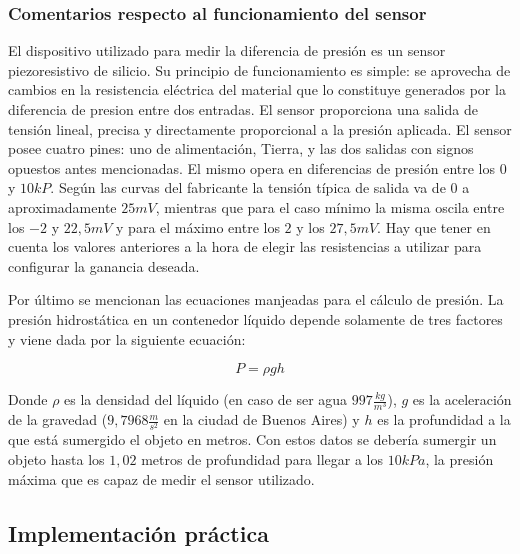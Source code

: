 \subsubsection{Comentarios respecto al funcionamiento del sensor}

El dispositivo utilizado para medir la diferencia de presi\'on es un sensor piezoresistivo de silicio. Su principio de funcionamiento es simple: se aprovecha de cambios en la resistencia eléctrica del material que lo constituye generados por la diferencia de presion entre dos entradas. El sensor proporciona una salida de tensión lineal, precisa y directamente proporcional a la presión aplicada. El sensor posee cuatro pines: uno de alimentación, Tierra, y las dos salidas con signos opuestos antes mencionadas. El mismo opera en diferencias de presión entre los $0$ y $10kP$. Según las curvas del fabricante la tensión típica de salida va de $0$ a aproximadamente $25mV$, mientras que para el caso mínimo la misma oscila entre los $-2$ y $22,5mV$ y para el máximo entre los $2$ y los $27,5mV$. Hay que tener en cuenta los valores anteriores a la hora de elegir las resistencias a utilizar para configurar la ganancia deseada. 

Por último se mencionan las ecuaciones manjeadas para el cálculo de presi\'on. La presión hidrostática en un contenedor líquido depende solamente de tres factores y viene dada por la siguiente ecuaci\'on:

\begin{equation}
P = \rho gh
\end{equation}

Donde $\rho$ es la densidad del líquido (en caso de ser agua $997\frac{kg}{m^3}$), $g$ es la aceleración de la gravedad ($9,7968\frac{m}{s^2}$ en la ciudad de Buenos Aires) y $h$ es la profundidad a la que está sumergido el objeto en metros. Con estos datos se debería sumergir un objeto hasta los $1,02$ metros de profundidad para llegar a los $10kPa$, la presión máxima que es capaz de medir el sensor utilizado. 


\subsection{Implementación práctica}

